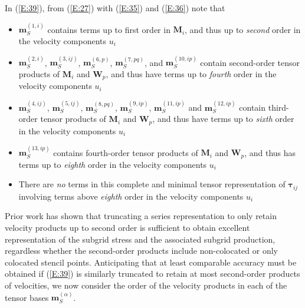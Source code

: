 In (\ref{E:39}), from (\ref{E:27}) with (\ref{E:35}) and (\ref{E:36}) note that
%
\begin{itemize}
%
	\item	$\mathbf{m}^{(1,i)}_{S}$ contains terms up to first order in $\mathbf{M}_{i}$, and thus up to \textit{second} order in the velocity components $u_i$ 
%	
	\item	$\mathbf{m}^{(2,i)}_{S}$, $\mathbf{m}^{(3,ij)}_{S}$, $\mathbf{m}^{(6,p)}_{S}$, $\mathbf{m}^{(7,pq)}_{S}$, and $\mathbf{m}^{(10,ip)}_{S}$  contain second-order tensor products of  $\mathbf{M}_{i}$  and $\mathbf{W}_{p}$, and thus have terms up to \textit{fourth} order in the velocity components  $u_i$ 
%	
	\item	 $\mathbf{m}^{(4,ij)}_{S}$, $\mathbf{m}^{(5,ij)}_{S}$, $\mathbf{m}^{(8,pq)}_{S}$, $\mathbf{m}^{(9,ip)}_{S}$, $\mathbf{m}^{(11,ip)}_{S}$ and $\mathbf{m}^{(12,ip)}_{S}$ contain third-order tensor products of $\mathbf{M}_{i}$  and $\mathbf{W}_{p}$, and thus have terms up to \textit{sixth} order in the velocity components $u_i$ 
%	
	\item	 $\mathbf{m}^{(13,ip)}_{S}$  contains fourth-order tensor products of $\mathbf{M}_{i}$  and $\mathbf{W}_{p}$, and thus has terms up to \textit{eighth} order in the velocity components $u_i$
%	
	\item	There are \textit{no} terms in this complete and minimal tensor representation of $\mathbf{\tau}_{ij}$  involving terms above \textit{eighth} order in the velocity components $u_i$
%
\end{itemize}
%
%   


Prior work has shown that truncating a  series representation to only retain velocity products up to second order is sufficient to obtain excellent representation of the subgrid stress and the associated subgrid production, regardless whether the second-order products include non-colocated or only colocated stencil points.  Anticipating that at least comparable accuracy must be obtained if (\ref{E:39}) is similarly truncated to retain at most second-order products of velocities, we now consider the order of the velocity products in each of the tensor bases  $\mathbf{m}^{(\alpha)}_{S}$.


